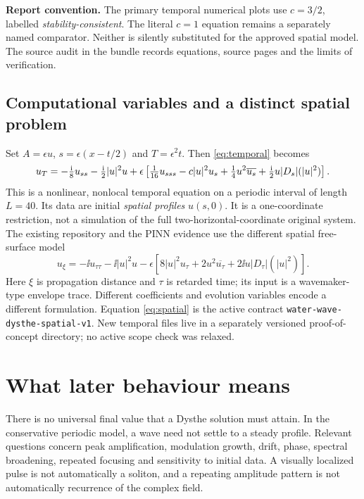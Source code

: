 \textbf{Report convention.} The primary temporal numerical plots use $c=3/2$, labelled \emph{stability-consistent}. The literal $c=1$ equation remains a separately named comparator. Neither is silently substituted for the approved spatial model. The source audit in the bundle records equations, source pages and the limits of verification.

\subsection{Computational variables and a distinct spatial problem}
Set $A=\epsilon u$, $s=\epsilon(x-t/2)$ and $T=\epsilon^2t$. Then \eqref{eq:temporal} becomes
\begin{equation}
 u_T=-\tfrac{\mathrm{i}}{8}u_{ss}-\tfrac{\mathrm{i}}{2}|u|^2u
 +\epsilon\left[\tfrac1{16}u_{sss}-c|u|^2u_s
 +\tfrac14u^2\overline{u_s}+\tfrac{\mathrm{i}}{2}u\lvert D_s\rvert(|u|^2)\right].
 \label{eq:scaled}
\end{equation}
This is a nonlinear, nonlocal temporal equation on a periodic interval of length $L=40$. Its data are initial \emph{spatial profiles} $u(s,0)$. It is a one-coordinate restriction, not a simulation of the full two-horizontal-coordinate original system.
\clearpage
The existing repository and the PINN evidence use the different spatial free-surface model \cite{fedele}
\begin{equation}
 u_\xi=-\ii u_{\tau\tau}-\ii|u|^2u
 -\epsilon\left[8|u|^2u_\tau+2u^2\overline{u_\tau}
                  +2\ii u|D_\tau|(|u|^2)\right].\label{eq:spatial}
\end{equation}
Here $\xi$ is propagation distance and $\tau$ is retarded time; its input is a wavemaker-type envelope trace. Different coefficients and evolution variables encode a different formulation. Equation \eqref{eq:spatial} is the active contract \texttt{water-wave-dysthe-spatial-v1}. New temporal files live in a separately versioned proof-of-concept directory; no active scope check was relaxed.

\section{What later behaviour means}\label{sec:later}
There is no universal final value that a Dysthe solution must attain. In the conservative periodic model, a wave need not settle to a steady profile. Relevant questions concern peak amplification, modulation growth, drift, phase, spectral broadening, repeated focusing and sensitivity to initial data. A visually localized pulse is not automatically a soliton, and a repeating amplitude pattern is not automatically recurrence of the complex field.

